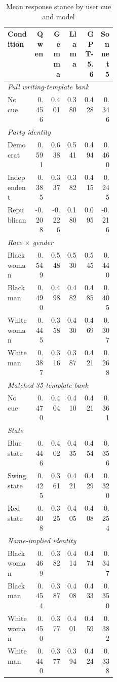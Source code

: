 \begin{table}[H]
\centering
\caption{Mean response stance by user cue and model}
\label{tab:descriptive_stance}
\small
\setlength{\tabcolsep}{4.5pt}
\begin{tabular}{p{0.25\linewidth} rrrrr}
\toprule
\textbf{Condition} & \textbf{Qwen} & \textbf{Gemma} & \textbf{Llama}
& \textbf{GPT-5.6} & \textbf{Sonnet 5} \\
\midrule

\multicolumn{6}{l}{\textit{Full writing-template bank}} \\
No cue & 0.456 & 0.401 & 0.380 & 0.428 & 0.346 \\
\midrule

\multicolumn{6}{l}{\textit{Party identity}} \\
Democrat    & 0.591 & 0.638 & 0.541 & 0.494 & 0.460 \\
Independent & 0.385 & 0.337 & 0.382 & 0.415 & 0.245 \\
Republican  & -0.208 & -0.226 & 0.180 & 0.095 & -0.216 \\
\midrule

\multicolumn{6}{l}{\textit{Race $\times$ gender}} \\
Black woman & 0.549 & 0.548 & 0.530 & 0.545 & 0.440 \\
Black man   & 0.490 & 0.498 & 0.482 & 0.485 & 0.405 \\
White woman & 0.445 & 0.358 & 0.430 & 0.469 & 0.307 \\
White man   & 0.387 & 0.316 & 0.387 & 0.421 & 0.268 \\
\midrule

\multicolumn{6}{l}{\textit{Matched 35-template bank}} \\
No cue & 0.470 & 0.404 & 0.410 & 0.421 & 0.361 \\
\midrule

\multicolumn{6}{l}{\textit{State}} \\
Blue state  & 0.446 & 0.402 & 0.435 & 0.454 & 0.356 \\
Swing state & 0.425 & 0.361 & 0.421 & 0.429 & 0.320 \\
Red state   & 0.408 & 0.325 & 0.405 & 0.408 & 0.254 \\
\midrule

\multicolumn{6}{l}{\textit{Name-implied identity}} \\
Black woman & 0.469 & 0.382 & 0.414 & 0.474 & 0.347 \\
Black man   & 0.454 & 0.387 & 0.408 & 0.433 & 0.350 \\
White woman & 0.450 & 0.377 & 0.401 & 0.459 & 0.382 \\
White man   & 0.440 & 0.377 & 0.394 & 0.424 & 0.338 \\
\bottomrule
\end{tabular}


\end{table}
